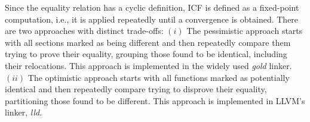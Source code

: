 

Since the equality relation has a cyclic definition, ICF is defined as a fixed-point computation, i.e., it is applied repeatedly until a convergence is obtained.
There are two approaches with distinct trade-offs:
$(i)$ The pessimistic approach starts with all sections marked as being different and then repeatedly compare them trying to prove their equality, grouping those found to be identical, including their relocations.
This approach is implemented in the widely used \textit{gold} linker.
$(ii)$ The optimistic approach starts with all functions marked as potentially identical and then repeatedly compare trying to disprove their equality, partitioning those found to be different.
This approach is implemented in LLVM's linker, \textit{lld}.


